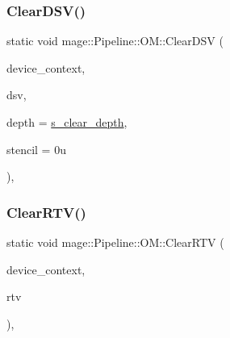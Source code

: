 \hypertarget{structmage_1_1_pipeline_1_1_o_m_a7448e932abce8f98ebe2375d31a457ff}{}\label{structmage_1_1_pipeline_1_1_o_m_a7448e932abce8f98ebe2375d31a457ff} 
\subsubsection{\texorpdfstring{Clear\+D\+S\+V()}{ClearDSV()}}
{\footnotesize\ttfamily static void mage\+::\+Pipeline\+::\+O\+M\+::\+Clear\+D\+SV (\begin{DoxyParamCaption}\item[{I\+D3\+D11\+Device\+Context4 $\ast$}]{device\+\_\+context,  }\item[{I\+D3\+D11\+Depth\+Stencil\+View $\ast$}]{dsv,  }\item[{\hyperlink{namespacemage_aa97e833b45f06d60a0a9c4fc22ae02c0}{F32}}]{depth = {\ttfamily \hyperlink{structmage_1_1_pipeline_1_1_o_m_a24388e030eff7d28a3b1fb59f3cf57d5}{s\+\_\+clear\+\_\+depth}},  }\item[{\hyperlink{namespacemage_afc638980bc6154f15af5e2d93a0e0ea9}{U8}}]{stencil = {\ttfamily 0u} }\end{DoxyParamCaption})\hspace{0.3cm}{\ttfamily [static]}, {\ttfamily [noexcept]}}

\hypertarget{structmage_1_1_pipeline_1_1_o_m_aa2383d1a29a34cacbc9fd96f97af31f7}{}\label{structmage_1_1_pipeline_1_1_o_m_aa2383d1a29a34cacbc9fd96f97af31f7} 
\subsubsection{\texorpdfstring{Clear\+R\+T\+V()}{ClearRTV()}\hspace{0.1cm}{\footnotesize\ttfamily [1/2]}}
{\footnotesize\ttfamily static void mage\+::\+Pipeline\+::\+O\+M\+::\+Clear\+R\+TV (\begin{DoxyParamCaption}\item[{I\+D3\+D11\+Device\+Context4 $\ast$}]{device\+\_\+context,  }\item[{I\+D3\+D11\+Render\+Target\+View $\ast$}]{rtv }\end{DoxyParamCaption})\hspace{0.3cm}{\ttfamily [static]}, {\ttfamily [noexcept]}}

